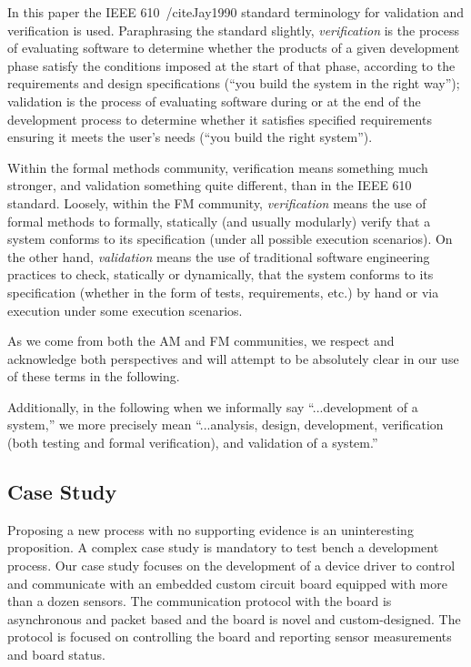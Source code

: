 \documentclass[english]{lni}
\begin{document}
In this paper the IEEE 610~/cite{Jay1990} standard terminology for validation and
verification is used.  Paraphrasing the standard
slightly, \emph{verification} is the process of evaluating software to
determine whether the products of a given development phase satisfy
the conditions imposed at the start of that phase, according to the
requirements and design specifications (``you build the system in the
right way''); validation is the process of evaluating software during
or at the end of the development process to determine whether it
satisfies specified requirements ensuring it meets the user's needs
(``you build the right system'').

Within the formal methods community, verification means something much
stronger, and validation something quite different, than in the IEEE
610 standard.  Loosely, within the FM community, \emph{verification}
means the use of formal methods to formally, statically (and usually
modularly) verify that a system conforms to its specification (under
all possible execution scenarios).  On the other hand,
\emph{validation} means the use of traditional software engineering
practices to check, statically or dynamically, that the system
conforms to its specification (whether in the form of tests,
requirements, etc.) by hand or via execution under some execution
scenarios.

As we come from both the AM and FM communities, we respect and
acknowledge both perspectives and will attempt to be absolutely clear
in our use of these terms in the following.

Additionally, in the following when we informally say ``...development
of a system,'' we more precisely mean ``...analysis, design,
development, verification (both testing and formal verification), and
validation of a system.''

\subsection{Case Study}
\label{sec:case-study}

Proposing a new process with no supporting evidence is an
uninteresting proposition.  A complex case study is mandatory to test
bench a development process.  Our case study focuses on the
development of a device driver to control and communicate with an
embedded custom circuit board equipped with more than a dozen sensors.
The communication protocol with the board is asynchronous and packet
based and the board is novel and custom-designed.  The protocol is
focused on controlling the board and reporting sensor measurements and
board status.
\end{document}
